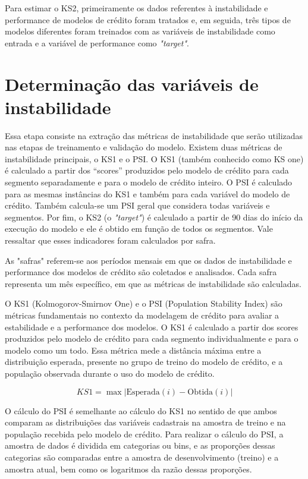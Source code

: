 Para estimar o KS2, primeiramente os dados referentes à instabilidade e performance de modelos de crédito foram tratados e, em seguida, três tipos de modelos diferentes foram treinados com as variáveis de instabilidade como entrada e a variável de performance como \emph{"target"}.
    
\section{Determinação das variáveis de instabilidade}

Essa etapa consiste na extração das métricas de instabilidade que serão utilizadas nas etapas de  treinamento e validação do modelo. Existem duas métricas de instabilidade principais, o KS1 e o PSI. O KS1 (também conhecido como KS one)  é calculado a partir dos “scores” produzidos pelo modelo de crédito para cada segmento separadamente e para o modelo de crédito inteiro. O PSI é calculado para as mesmas instâncias do KS1 e também para cada variável do modelo de crédito. Também calcula-se um PSI geral que considera todas variáveis e segmentos. Por fim, o KS2 (o \emph{"target"}) é calculado a partir de 90 dias do início da execução do modelo e ele é obtido em função de todos os segmentos. Vale ressaltar que esses indicadores foram calculados por safra.

As "safras" referem-se aos períodos mensais em que os dados de instabilidade e performance dos modelos de crédito são coletados e analisados. Cada safra representa um mês específico, em que as métricas de instabilidade são calculadas.

O KS1 (Kolmogorov-Smirnov One) e o PSI (Population Stability Index) são métricas fundamentais no contexto da modelagem de crédito para avaliar a estabilidade e a performance dos modelos. O KS1 é calculado a partir dos scores produzidos pelo modelo de crédito para cada segmento individualmente e para o modelo como um todo. Essa métrica mede a distância máxima entre a distribuição esperada, presente no grupo de treino do modelo de crédito, e a população observada durante o uso do modelo de crédito.

\begin{equation}
KS1 = \max \left| \text{Esperada}(i) - \text{Obtida}(i) \right|
\end{equation}

O cálculo do PSI é semelhante ao cálculo do KS1 no sentido de que ambos comparam as distribuições das variáveis cadastrais na amostra de treino e na população recebida pelo modelo de crédito. Para realizar o cálculo do PSI, a amostra de dados é dividida em categorias ou bins, e as proporções dessas categorias são comparadas entre a amostra de desenvolvimento (treino) e a amostra atual, bem como os logaritmos da razão dessas proporções.

